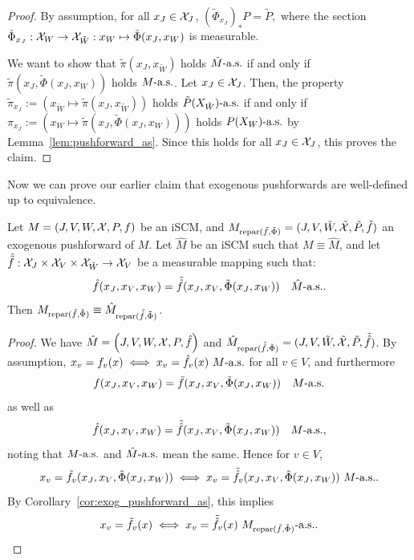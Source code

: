 \begin{proof}
  By assumption, for all $x_J \in \mathcal{X}_J$, $(\tilde{\Phi}_{x_J})_* P = \tilde{P},$ where the section $\tilde{\Phi}_{x_J} : \mathcal{X}_W \to \mathcal{X}_{\tilde{W}} : x_W \mapsto \tilde\Phi(x_J,x_W)$ is measurable. 

  We want to show that
  $\tilde\pi(x_J,x_{\tilde{W}})$ holds $\tilde{M}\text{-a.s.}$ if and only if $\tilde\pi(x_J,\tilde\Phi(x_J,x_W))$ holds $M\text{-a.s.}$.
  Let $x_J \in \mathcal{X}_J$.
  Then, the property $\tilde\pi_{x_J} := (x_{\tilde{W}} \mapsto \tilde\pi(x_J,x_{\tilde{W}}))$ holds $\tilde{P}(X_{\tilde{W}})\text{-a.s.}$ if and only if $\pi_{x_J} := (x_W \mapsto \tilde\pi(x_J,\tilde\Phi(x_J,x_W)))$ holds $P(X_W)\text{-a.s.}$ by Lemma~\ref{lem:pushforward_as}.
  Since this holds for all $x_J \in \mathcal{X}_J$, this proves the claim.
\end{proof}

Now we can prove our earlier claim that exogenous pushforwards are well-defined up to equivalence.
\begin{Lem}\label{lem:exog_pushforward_equiv}
  Let $M = \left ( J, V, W, \mathcal{X}, P, f \right )$ be an iSCM, and $M_{\mathrm{repar}({\tilde{f}},{\tilde{\Phi}})} = ( J, V, \tilde{W}, \tilde{\mathcal{X}}, \tilde{P}, \tilde{f} )$ an exogenous pushforward of $M$.
  Let $\hat{M}$ be an iSCM such that $M \equiv \hat{M}$, and let
  $\hat{\tilde{f}} : \mathcal{X}_{J} \times \mathcal{X}_{V} \times \mathcal{X}_{\tilde{W}} \to \mathcal{X}_{V}$ be a measurable mapping such that:
    $$\hat{f}(x_J,x_V,x_W) = \tilde{\hat{f}}(x_J,x_V,\tilde{\Phi}(x_J,x_W)) \quad \hat{M}\text{-a.s.}.$$
  Then $M_{\mathrm{repar}({\tilde{f}},{\tilde{\Phi}})} \equiv \hat{M}_{\mathrm{repar}({\tilde{\hat{f}}},{\tilde{\Phi}})}$.
\end{Lem}
\begin{proof}
  We have $\hat{M} = \left ( J, V, W, \mathcal{X}, P, \hat{f} \right )$ and $\hat{M}_{\mathrm{repar}({\tilde{\hat{f}}},{\tilde{\Phi}})} = ( J, V, \tilde{W}, \tilde{\mathcal{X}}, \tilde{P}, \tilde{\hat{f}} )$.
  By assumption, $x_v = f_v(x) \iff x_v = \hat{f}_v(x)\ M\text{-a.s.}$ for all $v \in V$, 
  and furthermore
    $$f(x_J,x_V,x_W) = \tilde{f}(x_J,x_V,\tilde{\Phi}(x_J,x_W)) \quad M\text{-a.s.}$$
  as well as
    $$\hat{f}(x_J,x_V,x_W) = \tilde{\hat{f}}(x_J,x_V,\tilde{\Phi}(x_J,x_W)) \quad M\text{-a.s.},$$
  noting that $M\text{-a.s.}$ and $\hat{M}\text{-a.s.}$ mean the same.
  Hence for $v \in V$,
  $$x_v = \tilde{f}_v(x_J,x_V,\tilde{\Phi}(x_J,x_W)) \iff x_v = \tilde{\hat{f}}_v(x_J,x_V,\tilde{\Phi}(x_J,x_W))\ M\text{-a.s.}.$$ 
  By Corollary~\ref{cor:exog_pushforward_as}, this implies
  $$x_v = \tilde{f}_v(x) \iff x_v = \tilde{\hat{f}}_v(x)\ M_{\repar{\tilde{f}}{\tilde{\Phi}}}\as.$$ 
\end{proof}


